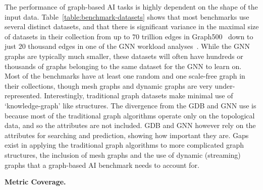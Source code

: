 The performance of graph-based AI tasks is highly dependent on the shape of the input data. 
Table~\ref{table:benchmark-datasets} shows that most benchmarks use several distinct datasets, and that there is significant variance in the maximal size of datasets in their collection from up to $70$ trillion edges in Graph500~\cite{Murphy2010} down to just $20$ thousand edges in one of the GNN workload analyses~\cite{Huang2021}.
While the GNN graphs are typically much smaller, these datasets will often have hundreds or thousands of graphs belonging to the same dataset for the GNN to learn on. 
Most of the benchmarks have at least one random and one scale-free graph in their collections, though mesh graphs and dynamic graphs are very under-represented. 
Interestingly, traditional graph datasets make minimal use of `knowledge-graph' like structures.
The divergence from the GDB and GNN use is because most of the traditional graph algorithms operate only on the topological data, and so the attributes are not included.
GDB and GNN however rely on the attributes for searching and prediction, showing how important they are. 
Gaps exist in applying the traditional graph algorithms to more complicated graph structures, the inclusion of mesh graphs and the use of dynamic (streaming) graphs that a graph-based AI benchmark needs to account for. 


\textbf{Metric Coverage.}

